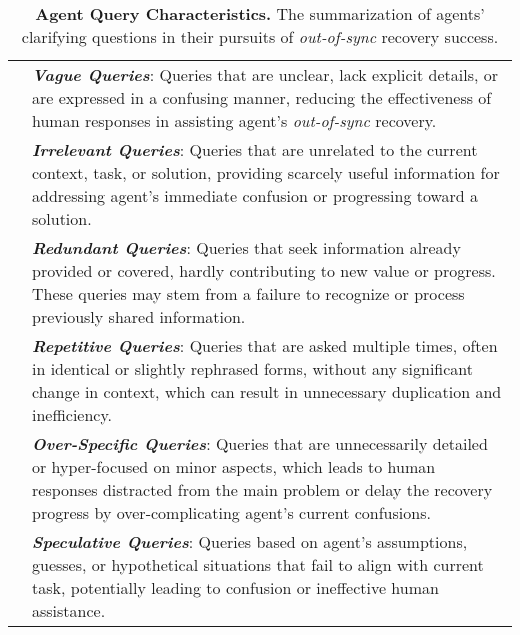 \begin{table}[H]
\begin{center}
\begin{small}

\caption{\textbf{Agent Query Characteristics.} The summarization of agents' clarifying questions in their pursuits of \textit{out-of-sync} recovery success.}
\label{tab:table C1 (Agent Query)}
    
    \begin{tabular}
    {>{\centering\arraybackslash}m{1.8cm}||>{\raggedright\arraybackslash}m{14.2cm}}
        \toprule
        \multicolumn{1}{c||}{\textbf{\textsc{Quality}}} & \multicolumn{1}{c}{\textbf{\textsc{Characteristics}}} \\ 
        
        \midrule
        
        \multirow{15}{*}{\centering\textbf{\textsc{Low}}} 
         & \textbf{\textit{Vague Queries}}: Queries that are unclear, lack explicit details, or are expressed in a confusing manner, reducing the effectiveness of human responses in assisting agent's \textit{out-of-sync} recovery. \\
         & \textbf{\textit{Irrelevant Queries}}: Queries that are unrelated to the current context, task, or solution, providing scarcely useful information for addressing agent's immediate confusion or progressing toward a solution. \\
         & \textbf{\textit{Redundant Queries}}: Queries that seek information already provided or covered, hardly contributing to new value or progress. These queries may stem from a failure to recognize or process previously shared information. \\
         & \textbf{\textit{Repetitive Queries}}: Queries that are asked multiple times, often in identical or slightly rephrased forms, without any significant change in context, which can result in unnecessary duplication and inefficiency. \\ 
         & \textbf{\textit{Over-Specific Queries}}: Queries that are unnecessarily detailed or hyper-focused on minor aspects, which leads to human responses distracted from the main problem or delay the recovery progress by over-complicating agent's current confusions. \\
         & \textbf{\textit{Speculative Queries}}: Queries based on agent's assumptions, guesses, or hypothetical situations that fail to align with current task, potentially leading to confusion or ineffective human assistance. \\


\end{tabular}
\end{small}
\end{center}
\end{table}
